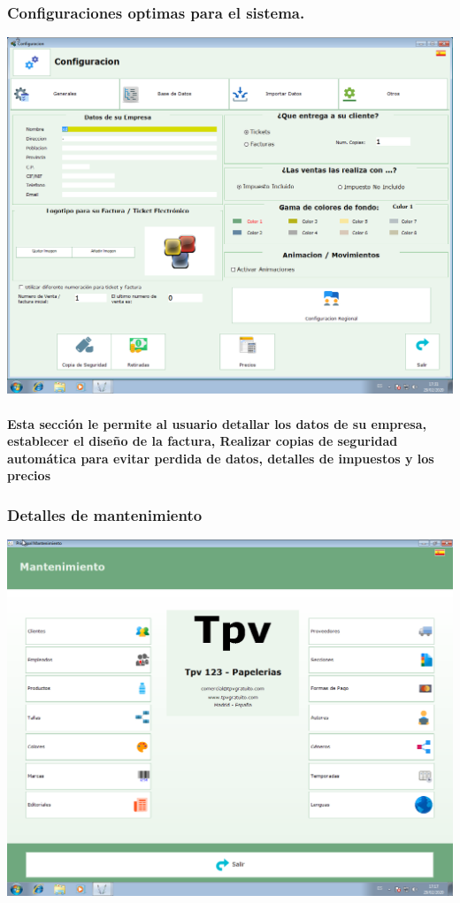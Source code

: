 \documentclass[12pt,a4paper]{article}
\begin{document}
\subsubsection*{Configuraciones optimas para el sistema.}
\includegraphics[scale=0.35]{Configuracion.png}
\paragraph{Esta sección le permite al usuario detallar los datos de su empresa, establecer el diseño de la factura, Realizar copias de seguridad automática para evitar perdida de datos, detalles de impuestos y los precios} 

\subsubsection*{Detalles de mantenimiento }
\includegraphics[scale=0.35]{Mantenimiento.png} 
\end{document}
